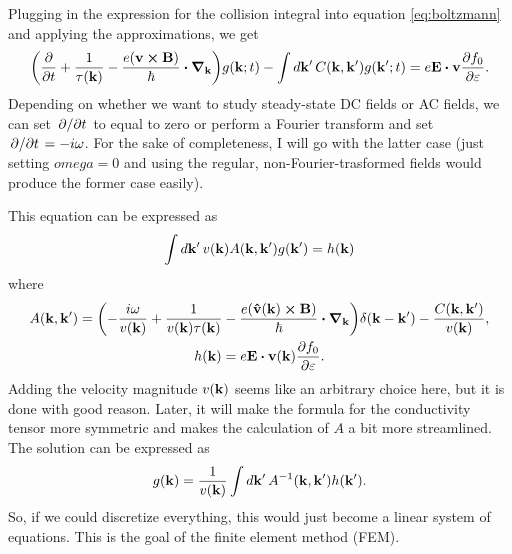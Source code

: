 \documentclass[12pt]{article}
\begin{document}
Plugging in the expression for the collision integral into equation \eqref{eq:boltzmann} and
applying the approximations, we get
\begin{equation}
    \qty(\pdv{t} + \frac{1}{\tau(\vb{k})} - \frac{e(\vb{v}\cross\vb{B})}{\hbar}\vdot\grad_{\vb{k}})
    g(\vb{k}; t) - \int\dd{\vb{k'}} C(\vb{k}, \vb{k'}) g(\vb{k'}; t)
    = e\vb{E}\vdot\vb{v}\pdv{f_0}{\varepsilon}.
\end{equation}
Depending on whether we want to study steady-state DC fields or AC fields, we can set $\pdv*{t}$ to
equal to zero or perform a Fourier transform and set $\pdv*{t} = -i\omega$. For the sake of
completeness, I will go with the latter case (just setting $omega=0$ and using the regular,
non-Fourier-trasformed fields would produce the former case easily).

This equation can be expressed as
\begin{equation}
    \int \dd{\vb{k'}} v(\vb{k}) A(\vb{k}, \vb{k'}) g(\vb{k'}) = h(\vb{k})
    \label{eq:integral_equation}
\end{equation}
where
\begin{gather}
    A(\vb{k}, \vb{k'}) = \qty(-\frac{i\omega}{v(\vb{k})} + \frac{1}{v(\vb{k})\tau(\vb{k})}
        - \frac{e\qty(\vu{v}(\vb{k})\cross\vb{B})}{\hbar}\vdot\grad_{\vb{k}})\delta(\vb{k}-\vb{k'})
        - \frac{C(\vb{k},\vb{k'})}{v(\vb{k})}, \label{eq:operator} \\
    h(\vb{k}) = e\vb{E}\vdot\vb{v}(\vb{k})\pdv{f_0}{\varepsilon}.
\end{gather}
Adding the velocity magnitude $v(\vb{k})$ seems like an arbitrary choice here, but it is done with
good reason. Later, it will make the formula for the conductivity tensor more symmetric and makes
the calculation of $A$ a bit more streamlined. The solution can be expressed as
\begin{equation}
    g(\vb{k}) = \frac{1}{v(\vb{k})} \int\dd{\vb{k'}} A^{-1}(\vb{k}, \vb{k'}) h(\vb{k'}).
\end{equation}
So, if we could discretize everything, this would just become a linear system of equations. This is
the goal of the finite element method (FEM).
\end{document}
